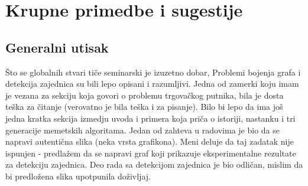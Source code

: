 \documentclass[a4paper]{report}
\begin{document}
\section{Krupne primedbe i sugestije}

\subsection{Generalni utisak}
Što se globalnih stvari tiče seminarski je izuzetno dobar, Problemi bojenja grafa i detekcija zajednica su bili lepo opisani i razumljivi. Jedna od zamerki koju imam je vezana za sekciju koja govori o problemu trgovačkog putnika, bila je dosta teška za čitanje (verovatno je bila teška i za pisanje).
Bilo bi lepo da ima još jedna kratka sekcija izmedju uvoda i primera koja priča o istoriji, nastanku i tri generacije memetskih algoritama.
Jedan od zahteva u radovima je bio da se napravi autentična slika (neka vrsta grafikona). Meni deluje da taj zadatak nije ispunjen - predlažem da se napravi graf koji prikazuje eksperimentalne rezultate za detekciju zajednica. Deo rada sa detekcijom zajednica je bio odličan, mislim da bi predložena slika upotpunila doživljaj.
\end{document}
